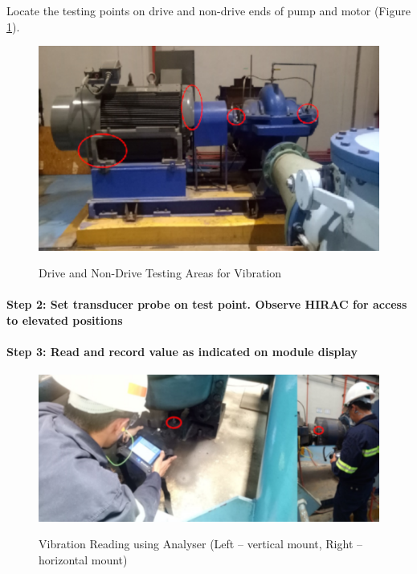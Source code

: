 Locate the testing points on drive and non-drive ends of pump and motor (Figure \ref{ch02_vibrationtest01}).

\begin{figure}[!htb]
	\includegraphics[scale=1.6]{figures/ch02_vibrationtest01} \\
	\caption{Drive and Non-Drive Testing Areas for Vibration}
	\label{ch02_vibrationtest01} 
\end{figure}

\paragraph{Step 2: Set transducer probe on test point. Observe HIRAC for access to elevated positions}
\paragraph{Step 3: Read and record value as indicated on module display}

\begin{figure}[!htb]
	\includegraphics[scale=1.3]{figures/ch02_vibrationtest02} \\
	\caption{Vibration Reading using Analyser (Left – vertical mount, Right – horizontal mount)}
	\label{ch02_vibrationtest02} 
\end{figure}

